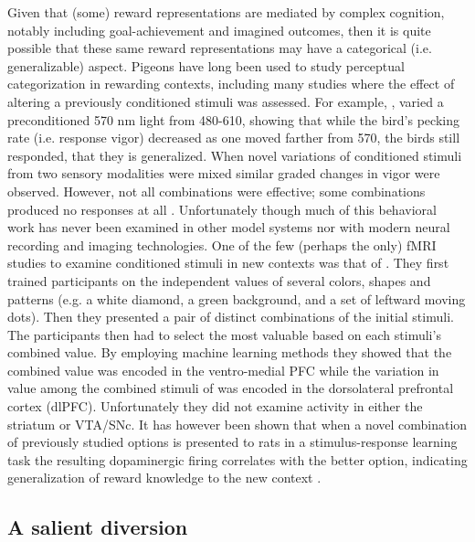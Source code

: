 \documentclass[doc,12pt]{apa}        %
\begin{document}
Given that (some) reward representations are mediated by complex cognition, notably including goal-achievement and imagined outcomes,  then it is quite possible that these same reward representations may have a categorical (i.e. generalizable) aspect.  Pigeons have long been used to study perceptual categorization in rewarding contexts, including many studies where the effect of altering a previously conditioned stimuli was assessed.  For example, , varied a preconditioned 570 nm light from 480-610, showing that while the bird's pecking rate (i.e. response vigor) decreased as one moved farther from 570, the birds still responded, that they is generalized.  When novel variations of conditioned stimuli from two sensory modalities were mixed similar graded changes in vigor were observed. However, not all combinations were effective; some combinations produced no responses at all \cite{Blough:2001p8408,Simmons:2008p8405,Urcuioli:2001p8359}.  Unfortunately though much of this behavioral work has never been examined in other model systems nor with modern neural recording and imaging technologies.  One of the few (perhaps the only) fMRI studies to examine conditioned stimuli in new contexts was that of . They first trained participants on the independent values of several colors, shapes and patterns (e.g. a white diamond, a green background, and a set of leftward moving dots).  Then they presented a pair of distinct combinations of the initial stimuli.  The participants then had to select the most valuable based on each stimuli's combined value.  By employing machine learning methods they showed that the combined value was encoded in the ventro-medial PFC while the variation in value among the combined stimuli of was encoded in the dorsolateral prefrontal cortex (dlPFC).  Unfortunately they did not examine activity in either the striatum or VTA/SNc.  It has however been shown that when a novel combination of previously studied options is presented to rats in a stimulus-response learning task the resulting dopaminergic firing correlates with the better option, indicating generalization of reward knowledge to the new context \cite{Roesch:2007p2519}.

\subsection{A salient diversion} %
\label{sub:sidebar_for_saliance}

\end{document}
